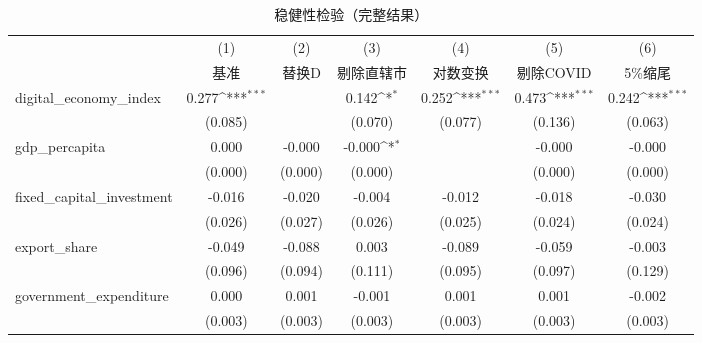 \begin{table}[htbp]\centering
\def\sym#1{\ifmmode^{#1}\else\(^{#1}\)\fi}
\caption{稳健性检验（完整结果）\label{tab:robustness\_full}}
\begin{tabular}{l*{6}{c}}
\toprule
                    &\multicolumn{1}{c}{(1)}&\multicolumn{1}{c}{(2)}&\multicolumn{1}{c}{(3)}&\multicolumn{1}{c}{(4)}&\multicolumn{1}{c}{(5)}&\multicolumn{1}{c}{(6)}\\
                    &\multicolumn{1}{c}{基准}&\multicolumn{1}{c}{替换D}&\multicolumn{1}{c}{剔除直辖市}&\multicolumn{1}{c}{对数变换}&\multicolumn{1}{c}{剔除COVID}&\multicolumn{1}{c}{5\%缩尾}\\
\midrule
digital\_economy\_index&       0.277\sym{***}&                     &       0.142\sym{*}  &       0.252\sym{***}&       0.473\sym{***}&       0.242\sym{***}\\
                    &     (0.085)         &                     &     (0.070)         &     (0.077)         &     (0.136)         &     (0.063)         \\
\addlinespace
gdp\_percapita       &       0.000         &      -0.000         &      -0.000\sym{*}  &                     &      -0.000         &      -0.000         \\
                    &     (0.000)         &     (0.000)         &     (0.000)         &                     &     (0.000)         &     (0.000)         \\
\addlinespace
fixed\_capital\_investment&      -0.016         &      -0.020         &      -0.004         &      -0.012         &      -0.018         &      -0.030         \\
                    &     (0.026)         &     (0.027)         &     (0.026)         &     (0.025)         &     (0.024)         &     (0.024)         \\
\addlinespace
export\_share        &      -0.049         &      -0.088         &       0.003         &      -0.089         &      -0.059         &      -0.003         \\
                    &     (0.096)         &     (0.094)         &     (0.111)         &     (0.095)         &     (0.097)         &     (0.129)         \\
\addlinespace
government\_expenditure&       0.000         &       0.001         &      -0.001         &       0.001         &       0.001         &      -0.002         \\
                    &     (0.003)         &     (0.003)         &     (0.003)         &     (0.003)         &     (0.003)         &     (0.003)         \\

\end{tabular}
\end{table}

